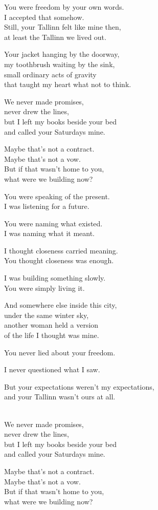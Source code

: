 \begin{lyrics}
You were freedom by your own words.\\
I accepted that somehow.\\
Still, your Tallinn felt like mine then,\\
at least the Tallinn we lived out.

Your jacket hanging by the doorway,\\
my toothbrush waiting by the sink,\\
small ordinary acts of gravity\\
that taught my heart what not to think.

We never made promises,\\
never drew the lines,\\
but I left my books beside your bed\\
and called your Saturdays mine.

Maybe that's not a contract.\\
Maybe that's not a vow.\\
But if that wasn't home to you,\\
what were we building now?

You were speaking of the present.\\
I was listening for a future.

You were naming what existed.\\
I was naming what it meant.

I thought closeness carried meaning.\\
You thought closeness was enough.

I was building something slowly.\\
You were simply living it.

And somewhere else inside this city,\\
under the same winter sky,\\
another woman held a version\\
of the life I thought was mine.

You never lied about your freedom.

I never questioned what I saw.

But your expectations weren't my expectations,\\
and your Tallinn wasn't ours at all.

\\
We never made promises,\\
never drew the lines,\\
but I left my books beside your bed\\
and called your Saturdays mine.

Maybe that's not a contract.\\
Maybe that's not a vow.\\
But if that wasn't home to you,\\
what were we building now?
\end{lyrics}

